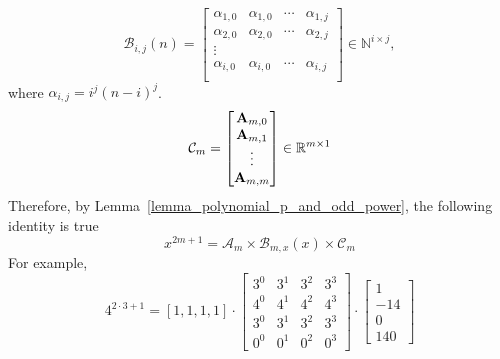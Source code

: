 \documentclass[12pt,letterpaper,oneside,reqno]{amsart}
\newcommand \coeffA [3][A] {{\mathbf{#1}} \sb{#2,#3}}
\numberwithin{equation}{section}
\begin{document}
    \begin{equation*}
        \mathcal{B}_{i,j}(n) =
        \begin{bmatrix}
            \alpha_{1,0} & \alpha_{1,0} & \cdots & \alpha_{1,j} \\
            \alpha_{2,0} & \alpha_{2,0} & \cdots & \alpha_{2,j} \\
            \vdots \\
            \alpha_{i,0} & \alpha_{i,0} & \cdots & \alpha_{i,j} \\
        \end{bmatrix} \in \mathbb{N}^{i \times j},
    \end{equation*}
    where $\alpha_{i,j} = i^j(n-i)^j$.
    \begin{equation*}
        \mathcal{C}_{m}=
        \begin{bmatrix}
            \coeffA{m}{0} \\
            \coeffA{m}{1} \\
            \vdots \\
            \coeffA{m}{m}
        \end{bmatrix} \in \mathbb{R}^{m \times 1}
    \end{equation*}
    Therefore, by Lemma~\ref{lemma_polynomial_p_and_odd_power}, the following identity is true
    \begin{equation*}
        x^{2m+1} = \mathcal{A}_{m} \times \mathcal{B}_{m,x}(x) \times \mathcal{C}_{m}
    \end{equation*}
    For example,
    \begin{equation*}
        4^{2 \cdot 3+1} = [1,1,1,1]
        \cdot
        \begin{bmatrix}
            3^0 & 3^1 & 3^2 & 3^3 \\
            4^0 & 4^1 & 4^2 & 4^3 \\
            3^0 & 3^1 & 3^2 & 3^3 \\
            0^0 & 0^1 & 0^2 & 0^3
        \end{bmatrix}
        \cdot
        \begin{bmatrix}
            1 \\
            -14 \\
            0 \\
            140
        \end{bmatrix}
    \end{equation*}
\end{document}
